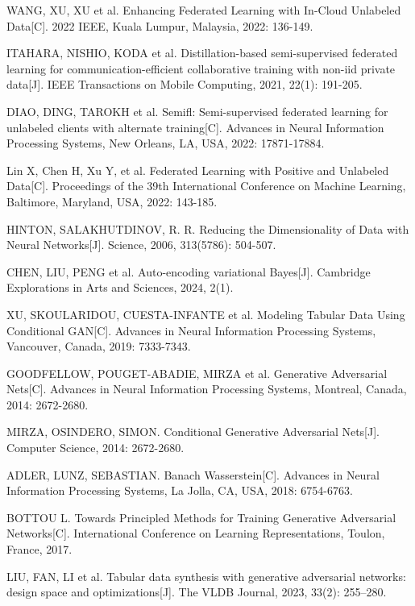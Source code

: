 \begin{thebibliography}{200}
	WANG, XU, XU et al. Enhancing Federated Learning with In-Cloud Unlabeled Data[C]. 2022 IEEE, Kuala Lumpur, Malaysia, 2022: 136-149.

	ITAHARA, NISHIO, KODA et al. Distillation-based semi-supervised federated learning for communication-efficient collaborative training with non-iid private data[J]. IEEE Transactions on Mobile Computing, 2021, 22(1): 191-205.

	DIAO, DING, TAROKH et al. Semifl: Semi-supervised federated learning for unlabeled clients with alternate training[C]. Advances in Neural Information Processing Systems, New Orleans, LA, USA, 2022: 17871-17884.
	
	Lin X, Chen H, Xu Y, et al. Federated Learning with Positive and Unlabeled Data[C]. Proceedings of the 39th International Conference on Machine Learning, Baltimore, Maryland, USA, 2022: 143-185.

	HINTON, SALAKHUTDINOV, R. R. Reducing the Dimensionality of Data with Neural Networks[J]. Science, 2006, 313(5786): 504-507.

	CHEN, LIU, PENG et al. Auto-encoding variational Bayes[J]. Cambridge Explorations in Arts and Sciences, 2024, 2(1).

	XU, SKOULARIDOU, CUESTA-INFANTE et al. Modeling Tabular Data Using Conditional GAN[C]. Advances in Neural Information Processing Systems, Vancouver, Canada, 2019: 7333-7343.

	GOODFELLOW, POUGET-ABADIE, MIRZA et al. Generative Adversarial Nets[C]. Advances in Neural Information Processing Systems, Montreal, Canada, 2014: 2672-2680.

	MIRZA, OSINDERO, SIMON. Conditional Generative Adversarial Nets[J]. Computer Science, 2014: 2672-2680.

	ADLER, LUNZ, SEBASTIAN. Banach Wasserstein[C]. Advances in Neural Information Processing Systems, La Jolla, CA, USA, 2018: 6754-6763.

	BOTTOU L. Towards Principled Methods for Training Generative Adversarial Networks[C]. International Conference on Learning Representations, Toulon, France, 2017.

	LIU, FAN, LI et al. Tabular data synthesis with generative adversarial networks: design space and optimizations[J]. The VLDB Journal, 2023, 33(2): 255–280.


\end{thebibliography}
